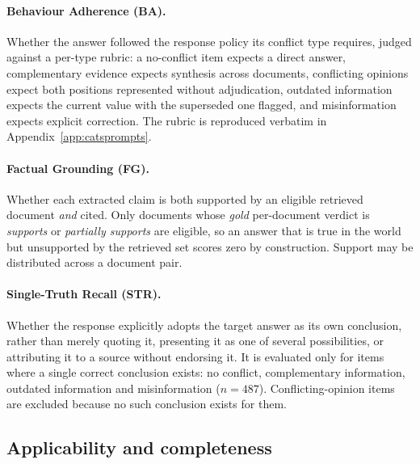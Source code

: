 

\paragraph{Behaviour Adherence (BA).} Whether the answer followed the response
policy its conflict type requires, judged against a per-type rubric: a
no-conflict item expects a direct answer, complementary evidence expects
synthesis across documents, conflicting opinions expect both positions
represented without adjudication, outdated information expects the current value
with the superseded one flagged, and misinformation expects explicit correction.
The rubric is reproduced verbatim in Appendix~\ref{app:catsprompts}.

\paragraph{Factual Grounding (FG).} Whether each extracted claim is both
supported by an eligible retrieved document \emph{and} cited. Only documents
whose \emph{gold} per-document verdict is \textit{supports} or \textit{partially
supports} are eligible, so an answer that is true in the world but unsupported by
the retrieved set scores zero by construction. Support may be distributed across
a document pair.

\paragraph{Single-Truth Recall (STR).} Whether the response explicitly adopts the
target answer as its own conclusion, rather than merely quoting it, presenting it
as one of several possibilities, or attributing it to a source without endorsing
it. It is evaluated only for items where a single correct conclusion exists: no
conflict, complementary information, outdated information and misinformation
($n=487$). Conflicting-opinion items are excluded because no such conclusion
exists for them.

\subsection{Applicability and completeness}

